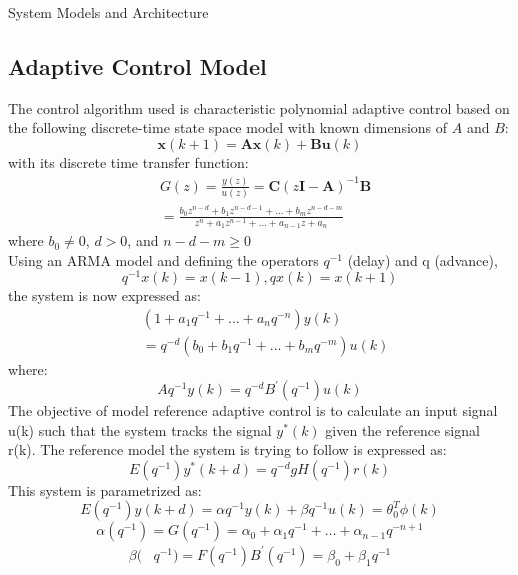\begin{section}{System Models and Architecture}
\subsection{Adaptive Control Model}
The control algorithm used is characteristic polynomial adaptive control based on the following discrete-time state space model with known dimensions of $A$ and $B$:
	\begin{equation}
	\bm{x}(k+1) = \bm{A}\bm{x}(k) + \bm{B}\bm{u}(k)
	\end{equation}
with its discrete time transfer function:
	\begin{align}
        & G(z) = \frac{y(z)}{u(z)} = \bm{C}(z\bm{I}-\bm{A})^{-1}\bm{B} \nonumber \\ 
	& = \frac{b_0z^{n-d}+b_1z^{n-d-1} +...+b_mz^{n-d-m}}{z^{n}+a_1z^{n-1}+...+a_{n-1}z+a_n}
	\end{align}
where $b_0\ne{0}$, $d>0$, and $n-d-m\geq{0}$\\
Using an ARMA model and defining the operators $q^{-1}$ (delay) and q (advance),
	\begin{equation}
	q^{-1}x(k) = x(k-1), qx(k) = x(k+1)
	\end{equation}
the system is now expressed as:
	\begin{align}
	& (1+a_1q^{-1}+...+a_nq^{-n})y(k) \nonumber \\
	& =q^{-d}(b_0+b_1q^{-1}+...+b_mq^{-m})u(k)
	\end{align}
where:
	\begin{equation}
	Aq^{-1}y(k)=q^{-d}B^{'}(q^{-1})u(k)
	\end{equation}
The objective of model reference adaptive control is to calculate an input signal u(k) such that the system tracks the signal $y^{*}(k)$ given the reference signal r(k). The reference model the system is trying to follow is expressed as:
	\begin{equation}
	E(q^{-1})y^*(k+d)=q^{-d}gH(q^{-1})r(k)
	\end{equation}
This system is parametrized as:
	\begin{equation}
	E(q^{-1})y(k+d)={\alpha}q^{-1}y(k) + {\beta}q^{-1}u(k)=\theta_0^T\phi(k)
	\end{equation}
	\begin{equation}
	\alpha(q^{-1})=G(q^{-1})=\alpha_0+\alpha_1q^{-1}+ \dots +\alpha_{n-1}q^{-n+1}
	\end{equation}
	\begin{align}
	\beta( & q^{-1})=F(q^{-1})B^{'}(q^{-1})=\beta_0+\beta_1q^{-1} \nonumber \\

\end{align}
\end{section}
